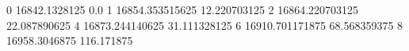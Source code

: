 0 16842.1328125 0.0
1 16854.353515625 12.220703125
2 16864.220703125 22.087890625
4 16873.244140625 31.111328125
6 16910.701171875 68.568359375
8 16958.3046875 116.171875
